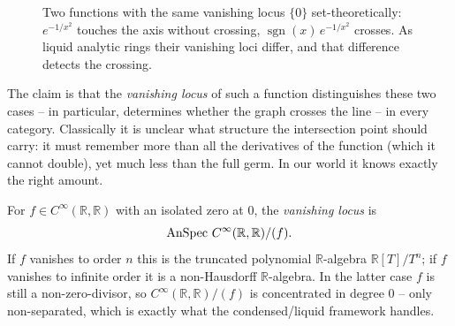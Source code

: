 \begin{figure}[ht]
\centering
{}\qquad
{}
\caption{Two functions with the same vanishing locus $\{0\}$ set-theoretically:
$e^{-1/x^2}$ touches the axis without crossing, $\operatorname{sgn}(x)\,e^{-1/x^2}$
crosses. As liquid analytic rings their vanishing loci differ, and that difference
detects the crossing.}
\label{fig:24:two-functions}
\end{figure}

\noindent The claim is that the \emph{vanishing locus} of such a function
distinguishes these two cases -- in particular, determines whether the graph
crosses the line -- in every category. Classically it is unclear what structure
the intersection point should carry: it must remember more than all the
derivatives of the function (which it cannot double), yet much less than the full
germ. In our world it knows exactly the right amount.

\begin{definition}
\label{def:24:vanishing-locus}
For $f\in C^\infty(\mathbb R,\mathbb R)$ with an isolated zero at $0$, the
\emph{vanishing locus} is
\begin{equation*}
\operatorname{AnSpec}\, C^\infty(\mathbb R,\mathbb R)/(f).
\end{equation*}
If $f$ vanishes to order $n$ this is the truncated polynomial $\mathbb R$-algebra
$\mathbb R[T]/T^n$; if $f$ vanishes to infinite order it is a non-Hausdorff
$\mathbb R$-algebra. In the latter case $f$ is still a non-zero-divisor, so
$C^\infty(\mathbb R,\mathbb R)/(f)$ is concentrated in degree $0$ -- only
non-separated, which is exactly what the condensed/liquid framework handles.
\end{definition}

